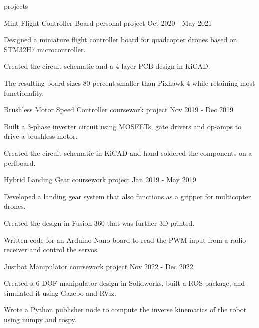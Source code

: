 \begin{section}{projects}
  
  \begin{project}
    {Mint Flight Controller Board}
    {personal project}
    {Oct 2020 - May 2021}

    \item Designed a miniature flight controller board for quadcopter drones based on STM32H7 microcontroller.
    \item Created the circuit schematic and a 4-layer PCB design in KiCAD.
    \item The resulting board sizes 80 percent smaller than Pixhawk 4 while retaining most functionality.
  
  \end{project}

  \begin{project}
    {Brushless Motor Speed Controller}
    {coursework project}
    {Nov 2019 - Dec 2019}

    \item Built a 3-phase inverter circuit using MOSFETs, gate drivers and op-amps to drive a brushless motor.
    \item Created the circuit schematic in KiCAD and hand-soldered the components on a perfboard.
  
  \end{project}

  \begin{project}
    {Hybrid Landing Gear}
    {coursework project}
    {Jan 2019 - May 2019}

    \item Developed a landing gear system that also functions as a gripper for multicopter drones.
    \item Created the design in Fusion 360 that was further 3D-printed.
    \item Written code for an Arduino Nano board to read the PWM input from a radio receiver and control the servos.
  
  \end{project}

  \begin{project}
    {Justbot Manipulator}
    {coursework project}
    {Nov 2022 - Dec 2022}

    \item Created a 6 DOF manipulator design in Solidworks, built a ROS package, and simulated it using Gazebo and RViz.
    \item Wrote a Python publisher node to compute the inverse kinematics of the robot using numpy and rospy.
  
  \end{project}

\end{section}